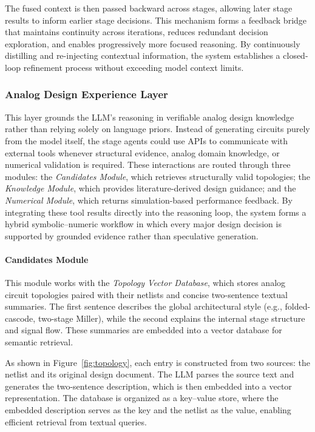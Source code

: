 \documentclass[sigconf,nonacm]{acmart}
\begin{document}
The fused context is then passed backward across stages, allowing later stage results to inform earlier stage decisions. This mechanism forms a feedback bridge that maintains continuity across iterations, reduces redundant decision exploration, and enables progressively more focused reasoning. By continuously distilling and re-injecting contextual information, the system establishes a closed-loop refinement process without exceeding model context limits.


\subsubsection{Analog Design Experience Layer}


This layer grounds the LLM’s reasoning in verifiable analog design knowledge rather than relying solely on language priors. Instead of generating circuits purely from the model itself, the stage agents could use APIs to communicate with external tools whenever structural evidence, analog domain knowledge, or numerical validation is required. These interactions are routed through three modules: the \emph{Candidates Module}, which retrieves structurally valid topologies; the \emph{Knowledge Module}, which provides literature-derived design guidance; and the \emph{Numerical Module}, which returns simulation-based performance feedback. By integrating these tool results directly into the reasoning loop, the system forms a hybrid symbolic–numeric workflow in which every major design decision is supported by grounded evidence rather than speculative generation.


\paragraph{Candidates Module}
This module works with the \emph{Topology Vector Database}, which stores analog circuit topologies paired with their netlists and concise two-sentence textual summaries. The first sentence describes the global architectural style (e.g., folded-cascode, two-stage Miller), while the second explains the internal stage structure and signal flow. These summaries are embedded into a vector database for semantic retrieval.

As shown in Figure~\ref{fig:topology}, each entry is constructed from two sources: the netlist and its original design document. The LLM parses the source text and generates the two-sentence description, which is then embedded into a vector representation. The database is organized as a key–value store, where the embedded description serves as the key and the netlist as the value, enabling efficient retrieval from textual queries. 
\end{document}
